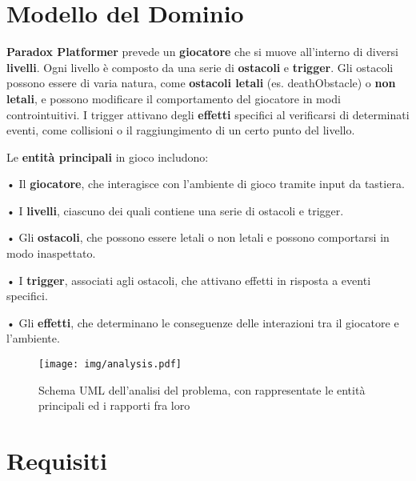 \documentclass[a4paper,12pt]{report}
\begin{document}
	\section{Modello del Dominio}
	
	\textbf{Paradox Platformer} prevede un \textbf{giocatore} che si muove all'interno di diversi \textbf{livelli}. Ogni livello è composto da una serie di \textbf{ostacoli} e \textbf{trigger}. Gli ostacoli possono essere di varia natura, come \textbf{ostacoli letali} (es. deathObstacle) o \textbf{non letali}, e possono modificare il comportamento del giocatore in modi controintuitivi. I trigger attivano degli \textbf{effetti} specifici al verificarsi di determinati eventi, come collisioni o il raggiungimento di un certo punto del livello.
	
	Le \textbf{entità principali} in gioco includono:
	
	• Il \textbf{giocatore}, che interagisce con l'ambiente di gioco tramite input da tastiera.
	
	• I \textbf{livelli}, ciascuno dei quali contiene una serie di ostacoli e trigger.
	
	• Gli \textbf{ostacoli}, che possono essere letali o non letali e possono comportarsi in modo inaspettato.
	
	• I \textbf{trigger}, associati agli ostacoli, che attivano effetti in risposta a eventi specifici.
	
	• Gli \textbf{effetti}, che determinano le conseguenze delle interazioni tra il giocatore e l'ambiente.
	
	\begin{figure}[H]
		\centering{}
		\texttt{[image: img/analysis.pdf]}
		\caption{Schema UML dell'analisi del problema, con rappresentate le entità principali ed i rapporti fra loro}
		\label{img:analysis}
	\end{figure}
	
	\section{Requisiti}
	
\end{document}
